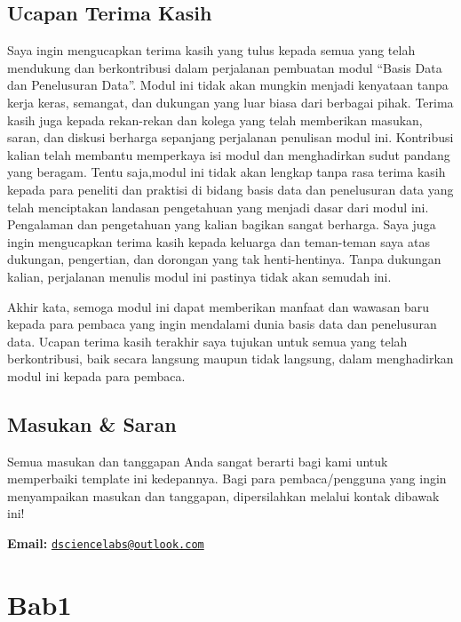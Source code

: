 \documentclass[
]{book}
\begin{document}
\hypertarget{ucapan-terima-kasih}{%
\section*{Ucapan Terima Kasih}\label{ucapan-terima-kasih}}

Saya ingin mengucapkan terima kasih yang tulus kepada semua yang telah mendukung dan berkontribusi dalam perjalanan pembuatan modul ``Basis Data dan Penelusuran Data''. Modul ini tidak akan mungkin menjadi kenyataan tanpa kerja keras, semangat, dan dukungan yang luar biasa dari berbagai pihak. Terima kasih juga kepada rekan-rekan dan kolega yang telah memberikan masukan, saran, dan diskusi berharga sepanjang perjalanan penulisan modul ini. Kontribusi kalian telah membantu memperkaya isi modul dan menghadirkan sudut pandang yang beragam. Tentu saja,modul ini tidak akan lengkap tanpa rasa terima kasih kepada para peneliti dan praktisi di bidang basis data dan penelusuran data yang telah menciptakan landasan pengetahuan yang menjadi dasar dari modul ini. Pengalaman dan pengetahuan yang kalian bagikan sangat berharga. Saya juga ingin mengucapkan terima kasih kepada keluarga dan teman-teman saya atas dukungan, pengertian, dan dorongan yang tak henti-hentinya. Tanpa dukungan kalian, perjalanan menulis modul ini pastinya tidak akan semudah ini.

Akhir kata, semoga modul ini dapat memberikan manfaat dan wawasan baru kepada para pembaca yang ingin mendalami dunia basis data dan penelusuran data. Ucapan terima kasih terakhir saya tujukan untuk semua yang telah berkontribusi, baik secara langsung maupun tidak langsung, dalam menghadirkan modul ini kepada para pembaca.

\hypertarget{masukan-saran}{%
\section*{Masukan \& Saran}\label{masukan-saran}}

Semua masukan dan tanggapan Anda sangat berarti bagi kami untuk memperbaiki template ini kedepannya. Bagi para pembaca/pengguna yang ingin menyampaikan masukan dan tanggapan, dipersilahkan melalui kontak dibawak ini!

\textbf{Email:} \href{mailto:dsciencelabs@outlook.com}{\nolinkurl{dsciencelabs@outlook.com}}

\hypertarget{bab1}{%
\chapter{Bab1}\label{bab1}}
\end{document}

